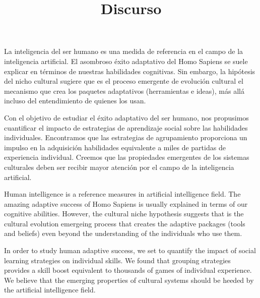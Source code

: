 \documentclass[a4paper,10pt]{article}
\title{Discurso}
\author{}
\begin{document}
\maketitle

La inteligencia del ser humano es una medida de referencia en el campo de la inteligencia artificial.
El asombroso \'exito adaptativo del Homo Sapiens se suele explicar en t\'erminos de nuestras habilidades cognitivas.
Sin embargo, la hip\'otesis del nicho cultural sugiere que es el proceso emergente de evoluci\'on cultural el mecanismo que crea los paquetes adaptativos (herramientas e ideas), m\'as allá incluso del entendimiento de quienes los usan.

Con el objetivo de estudiar el \'exito adaptativo del ser humano, nos propusimos cuantificar el impacto de estrategias de aprendizaje social sobre las habilidades individuales.
Encontramos que las estrategias de agrupamiento proporciona un impulso en la adquisición habilidades equivalente a miles de partidas de experiencia individual.
Creemos que las propiedades emergentes de los sistemas culturales deben ser recibir mayor atenci\'on por el campo de la inteligencia artificial.


\vspace{0.5cm}

Human intelligence is a reference measures in artificial intelligence field.
The amazing adaptive success of Homo Sapiens is usually explained in terms of our cognitive abilities.
However, the cultural niche hypothesis suggests that is the cultural evolution emergeing process that creates the adaptive packages (tools and beliefs) even beyond the understanding of the individuals who use them.

In order to study human adaptive success, we set to quantify the impact of social learning strategies on individual skills.
We found that grouping strategies provides a skill boost equivalent to thousands of games of individual experience.
We believe that the emerging properties of cultural systems should be heeded by the artificial intelligence field.
\end{document}
